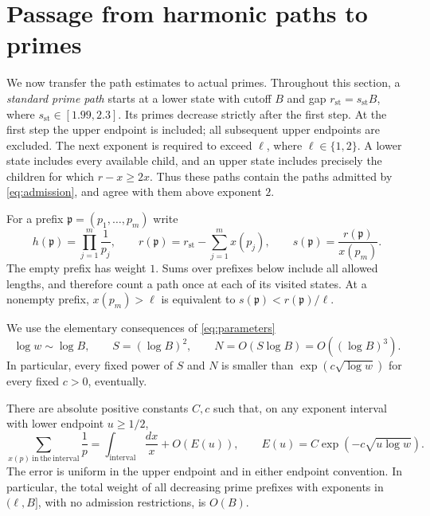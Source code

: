 \section{Passage from harmonic paths to primes}\label{sec:prime-paths}

We now transfer the path estimates to actual primes.  Throughout this
section, a \emph{standard prime path} starts at a lower state with cutoff
$B$ and gap $r_{\mathrm{st}}=s_{\mathrm{st}}B$, where
$s_{\mathrm{st}}\in[1.99,2.3]$.  Its primes decrease strictly after the
first step.  At the first step the upper endpoint is included; all
subsequent upper endpoints are excluded.  The next exponent is required
to exceed $\ell$, where $\ell\in\{1,2\}$.  A lower state includes every
available child, and an upper state includes precisely the children for
which $r-x\geq 2x$.  Thus these paths contain the paths admitted by
\eqref{eq:admission}, and agree with them above exponent $2$.

For a prefix $\mathfrak p=(p_1,\ldots,p_m)$ write
\[
 h(\mathfrak p)=\prod_{j=1}^m\frac1{p_j},\qquad
 r(\mathfrak p)=r_{\mathrm{st}}-\sum_{j=1}^m x(p_j),\qquad
 s(\mathfrak p)=\frac{r(\mathfrak p)}{x(p_m)}.
\]
The empty prefix has weight $1$.  Sums over prefixes below include all
allowed lengths, and therefore count a path once at each of its visited
states.  At a nonempty prefix, $x(p_m)>\ell$ is equivalent to
$s(\mathfrak p)<r(\mathfrak p)/\ell$.

We use the elementary consequences of \eqref{eq:parameters}
\begin{equation}\label{eq:prime-scales}
 \log w\sim\log B,\qquad
 S=(\log B)^2,\qquad N=O(S\log B)=O((\log B)^3).
\end{equation}
In particular, every fixed power of $S$ and $N$ is smaller than
$\exp(c\sqrt{\log w})$ for every fixed $c>0$, eventually.

\begin{lemma}\label{lem:prime-harmonic}
There are absolute positive constants $C,c$ such that, on any exponent
interval with lower endpoint $u\geq1/2$,
\begin{equation}\label{eq:prime-harmonic}
 \sum_{x(p)\ \mathrm{in\ the\ interval}}\frac1p
   =\int_{\mathrm{interval}}\frac{dx}{x}+O(E(u)),
 \qquad E(u)=C\exp(-c\sqrt{u\log w}).
\end{equation}
The error is uniform in the upper endpoint and in either endpoint
convention.  In particular, the total weight of all decreasing prime
prefixes with exponents in $(\ell,B]$, with no admission restrictions,
is $O(B)$.
\end{lemma}

